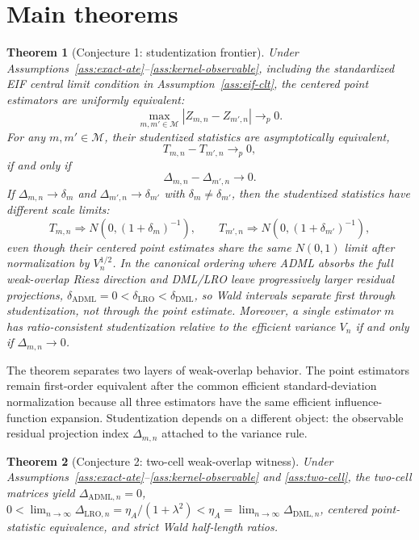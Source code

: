 \documentclass[11pt]{article}
\theoremstyle{definition}
\theoremstyle{plain}
\newtheorem{theorem}{Theorem}
\theoremstyle{remark}
\begin{document}
\section{Main theorems}
\begin{theorem}[Conjecture 1: studentization frontier]\label{thm:student-frontier}
Under Assumptions~\ref{ass:exact-ate}--\ref{ass:kernel-observable}, including the standardized EIF central limit condition in Assumption~\ref{ass:eif-clt}, the centered point estimators are uniformly equivalent:
\[
  \max_{m,m'\in\mathcal M}|Z_{m,n}-Z_{m',n}|\to_p0.
\]
For any \(m,m'\in\mathcal M\), their studentized statistics are asymptotically equivalent,
\[
  T_{m,n}-T_{m',n}\to_p0,
\]
if and only if
\[
  \Delta_{m,n}-\Delta_{m',n}\to0.
\]
If \(\Delta_{m,n}\to\delta_m\) and \(\Delta_{m',n}\to\delta_{m'}\) with \(\delta_m\ne\delta_{m'}\), then the studentized statistics have different scale limits:
\[
  T_{m,n}\Rightarrow N(0,(1+\delta_m)^{-1}),\qquad
  T_{m',n}\Rightarrow N(0,(1+\delta_{m'})^{-1}),
\]
even though their centered point estimates share the same \(N(0,1)\) limit after normalization by \(V_n^{1/2}\).  In the canonical ordering where ADML absorbs the full weak-overlap Riesz direction and DML/LRO leave progressively larger residual projections, \(\delta_{\mathrm{ADML}}=0<\delta_{\mathrm{LRO}}<\delta_{\mathrm{DML}}\), so Wald intervals separate first through studentization, not through the point estimate.  Moreover, a single estimator \(m\) has ratio-consistent studentization relative to the efficient variance \(V_n\) if and only if \(\Delta_{m,n}\to0\).
\end{theorem}

The theorem separates two layers of weak-overlap behavior.  The point estimators remain first-order equivalent after the common efficient standard-deviation normalization because all three estimators have the same efficient influence-function expansion.  Studentization depends on a different object: the observable residual projection index \(\Delta_{m,n}\) attached to the variance rule.

\begin{theorem}[Conjecture 2: two-cell weak-overlap witness]\label{thm:two-cell-witness}
Under Assumptions~\ref{ass:exact-ate}--\ref{ass:kernel-observable} and \ref{ass:two-cell}, the two-cell matrices yield \(\Delta_{\mathrm{ADML},n}=0\), \(0<\lim_{n\to\infty}\Delta_{\mathrm{LRO},n}=\eta_A/(1+\lambda^2)<\eta_A=\lim_{n\to\infty}\Delta_{\mathrm{DML},n}\), centered point-statistic equivalence, and strict Wald half-length ratios.
\end{theorem}
\end{document}

